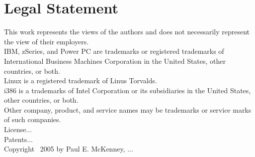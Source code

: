 
\section*{Legal Statement}

{ \small
This work represents the views of the authors and does not necessarily
represent the view of their employers.\\
IBM, zSeries, and Power PC are trademarks or registered trademarks of
International Business Machines Corporation in the United States,
other countries, or both.\\
Linux is a registered trademark of Linus Torvalds.\\
i386 is a trademarks of Intel Corporation or its
subsidiaries in the United States, other countries, or both. \\
Other company, product, and service names may be trademarks or service marks
of such companies.\\
License... \\
Patents... \\
Copyright {\textcopyright}~2005 by Paul E. McKenney, ...
}

